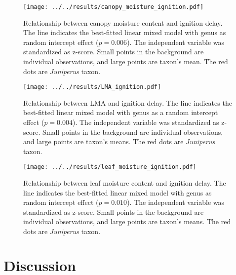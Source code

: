\documentclass{ttuthes2007}
\begin{document}
\begin{figure}[ht]
    \centering
    \texttt{[image: ../../results/canopy\_moisture\_ignition.pdf]}
    \caption[Canopy moisture effect on ignition delay]{\label{fig:canopy_moisture_ig_delay}Relationship between canopy moisture content and ignition delay. The line indicates the best-fitted linear mixed model with genus as random intercept effect ($p = 0.006$). The independent variable was standardized  as z-score. Small points in the background are individual observations, and large points are taxon's mean. The red dots are \emph{Juniperus} taxon.}
    
\end{figure}

\begin{figure}[ht]
  \centering \texttt{[image: ../../results/LMA\_ignition.pdf]}
  \caption[LMA effect on ignition delay]{\label{fig:lma_ig_delay} Relationship between LMA and ignition delay. The line indicates the best-fitted linear mixed model with genus as a random intercept effect ($p = 0.004$). The independent variable was standardized  as z-score. Small points in the background are individual observations, and large points are taxon's means. The red dots are \emph{Juniperus} taxon.}
  
\end{figure}



\begin{figure}[ht]
  \centering \texttt{[image: ../../results/leaf\_moisture\_ignition.pdf]}
  \caption[Leaf moisture content effect on ignition delay]{\label{fig:leafmc_ig_delay}Relationship between leaf moisture content and ignition delay. The line indicates the best-fitted linear mixed model with genus as random intercept effect ($p = 0.010$). The independent variable was standardized  as z-score. Small points in the background are individual observations, and large points are taxon's means. The red dots are \emph{Juniperus} taxon.}
  
\end{figure}




\section*{\textbf{Discussion}}
\end{document}
